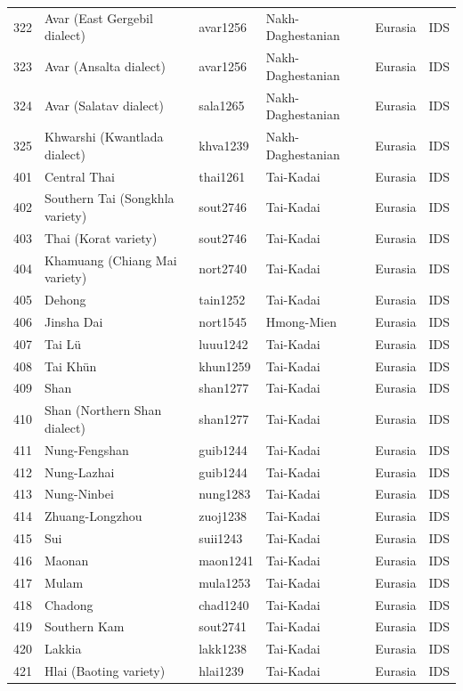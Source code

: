 \begin{table}[ht]
\begin{tabular}{rlllll}
  322 & Avar (East Gergebil dialect) & avar1256 & Nakh-Daghestanian & Eurasia & IDS \\ 
  323 & Avar (Ansalta dialect) & avar1256 & Nakh-Daghestanian & Eurasia & IDS \\ 
  324 & Avar (Salatav dialect) & sala1265 & Nakh-Daghestanian & Eurasia & IDS \\ 
  325 & Khwarshi (Kwantlada dialect) & khva1239 & Nakh-Daghestanian & Eurasia & IDS \\ 
  401 & Central Thai & thai1261 & Tai-Kadai & Eurasia & IDS \\ 
  402 & Southern Tai (Songkhla variety) & sout2746 & Tai-Kadai & Eurasia & IDS \\ 
  403 & Thai (Korat variety) & sout2746 & Tai-Kadai & Eurasia & IDS \\ 
  404 & Khamuang (Chiang Mai variety) & nort2740 & Tai-Kadai & Eurasia & IDS \\ 
  405 & Dehong & tain1252 & Tai-Kadai & Eurasia & IDS \\ 
  406 & Jinsha Dai & nort1545 & Hmong-Mien & Eurasia & IDS \\ 
  407 & Tai Lü & luuu1242 & Tai-Kadai & Eurasia & IDS \\ 
  408 & Tai Khün & khun1259 & Tai-Kadai & Eurasia & IDS \\ 
  409 & Shan & shan1277 & Tai-Kadai & Eurasia & IDS \\ 
  410 & Shan (Northern Shan dialect) & shan1277 & Tai-Kadai & Eurasia & IDS \\ 
  411 & Nung-Fengshan & guib1244 & Tai-Kadai & Eurasia & IDS \\ 
  412 & Nung-Lazhai & guib1244 & Tai-Kadai & Eurasia & IDS \\ 
  413 & Nung-Ninbei & nung1283 & Tai-Kadai & Eurasia & IDS \\ 
  414 & Zhuang-Longzhou & zuoj1238 & Tai-Kadai & Eurasia & IDS \\ 
  415 & Sui & suii1243 & Tai-Kadai & Eurasia & IDS \\ 
  416 & Maonan & maon1241 & Tai-Kadai & Eurasia & IDS \\ 
  417 & Mulam & mula1253 & Tai-Kadai & Eurasia & IDS \\ 
  418 & Chadong & chad1240 & Tai-Kadai & Eurasia & IDS \\ 
  419 & Southern Kam & sout2741 & Tai-Kadai & Eurasia & IDS \\ 
  420 & Lakkia & lakk1238 & Tai-Kadai & Eurasia & IDS \\ 
  421 & Hlai (Baoting variety) & hlai1239 & Tai-Kadai & Eurasia & IDS \\ 

\end{tabular}
\end{table}
